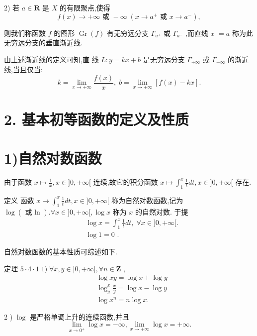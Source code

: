 2) 若 $a \in  \mathbf{R}$ 是 $X$ 的有限聚点,使得
$$f\left( x\right)  \rightarrow   + \infty \text{ 或 } - \infty \;\left( {x \rightarrow  {a}^{ + }\text{ 或 }x \rightarrow  {a}^{ - }}\right) ,$$

则我们称函数 $f$ 的图形 $\operatorname{Gr}\left( f\right)$ 有无穷远分支 ${\Gamma }_{{a}^{ + }}$ 或 ${\Gamma }_{{a}^{ - }}$ ,而直线 $x$  $= a$ 称为此无穷远分支的垂直渐近线.

由上述渐近线的定义可知,直 线 $L : y = {kx} + b$ 是无穷远分支 ${\Gamma }_{+\infty }$ 或 ${\Gamma }_{-\infty }$ 的渐近线,当且仅当:
$$k = \mathop{\lim }\limits_{{x \rightarrow   + \infty }}\frac{f\left( x\right) }{x},\;b = \mathop{\lim }\limits_{{x \rightarrow   + \infty }}\left\lbrack  {f\left( x\right)  - {kx}}\right\rbrack  .$$

\section*{2. 基本初等函数的定义及性质}

\section*{1)自然对数函数}

由于函数 $x \mapsto  \frac{1}{x},x \in  \rbrack 0, + \infty \lbrack$ 连续,故它的积分函数 $x \mapsto  {\int }_{1}^{x}\frac{1}{t}{dt},x \in  \rbrack 0, + \infty \lbrack$ 存在.

定义 函数 $x \mapsto  {\int }_{1}^{x}\frac{1}{t}{dt},x \in  \rbrack 0, + \infty \lbrack$ 称为自然对数函数,记为 $\log \left( \text{ 或 ln }\right) .\forall x \in  \rbrack 0, + \infty \lbrack ,\log x$ 称为 $x$ 的自然对数. 于提
\begin{align*}
	&\log x = {\int }_{1}^{x}\frac{1}{t}{dt},\;\forall x \in  \rbrack 0, + \infty \lbrack .\\
	&\log 1 = 0\text{ . }
\end{align*}

自然对数函数的基本性质可综述如下.

定理 $5 \cdot  4 \cdot  1\;1)\;\forall x,y \in  \rbrack 0, + \infty \lbrack ,\forall n \in  \mathbf{Z}$ ,
\begin{align*}
	&\log {xy} = \log x + \log y\\
	&{\log }_{y}^{x}\frac{x}{y} = \log x - \log y\\
	&\log {x}^{n} = n\log x.
\end{align*}

2 ) $\log$ 是严格单调上升的连续函数,并且
$$\mathop{\lim }\limits_{{x \rightarrow  {0}^{ + }}}\log x =  - \infty ,\mathop{\lim }\limits_{{x \rightarrow   + \infty }}\log x =  + \infty .$$

